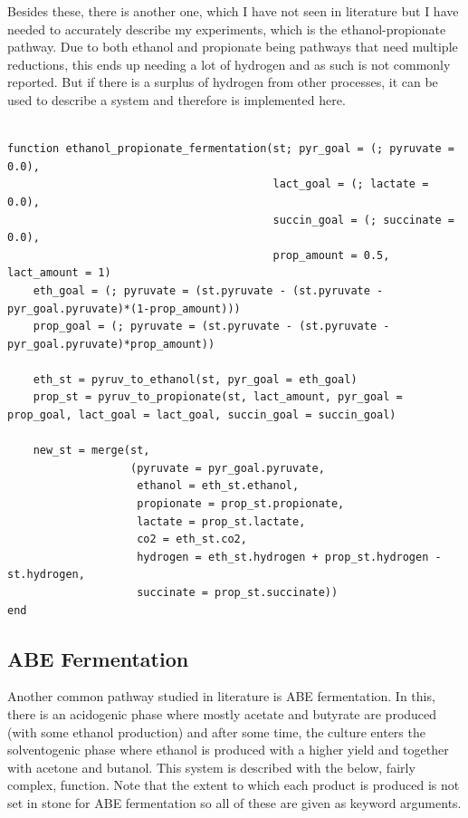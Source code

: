 \documentclass[11pt]{article}
\begin{document}
Besides these, there is another one, which I have not seen in literature but I have needed to accurately describe my experiments, which is the ethanol-propionate pathway. Due to both ethanol and propionate being pathways that need multiple reductions, this ends up needing a lot of hydrogen and as such is not commonly reported. But if there is a surplus of hydrogen from other processes, it can be used to describe a system and therefore is implemented here.

\begin{verbatim}

function ethanol_propionate_fermentation(st; pyr_goal = (; pyruvate = 0.0),
                                         lact_goal = (; lactate = 0.0),
                                         succin_goal = (; succinate = 0.0),
                                         prop_amount = 0.5, lact_amount = 1)
    eth_goal = (; pyruvate = (st.pyruvate - (st.pyruvate - pyr_goal.pyruvate)*(1-prop_amount)))
    prop_goal = (; pyruvate = (st.pyruvate - (st.pyruvate - pyr_goal.pyruvate)*prop_amount))

    eth_st = pyruv_to_ethanol(st, pyr_goal = eth_goal)
    prop_st = pyruv_to_propionate(st, lact_amount, pyr_goal = prop_goal, lact_goal = lact_goal, succin_goal = succin_goal)

    new_st = merge(st,
                   (pyruvate = pyr_goal.pyruvate,
                    ethanol = eth_st.ethanol,
                    propionate = prop_st.propionate,
                    lactate = prop_st.lactate,
                    co2 = eth_st.co2,
                    hydrogen = eth_st.hydrogen + prop_st.hydrogen - st.hydrogen,
                    succinate = prop_st.succinate))
end

\end{verbatim}

\subsection{ABE Fermentation}
\label{sec:orgf8252af}
Another common pathway studied in literature is ABE fermentation. In this, there is an acidogenic phase where mostly acetate and butyrate are produced (with some ethanol production) and after some time, the culture enters the solventogenic phase where ethanol is produced with a higher yield and together with acetone and butanol. This system is described with the below, fairly complex, function. Note that the extent to which each product is produced is not set in stone for ABE fermentation so all of these are given as keyword arguments.
\end{document}
